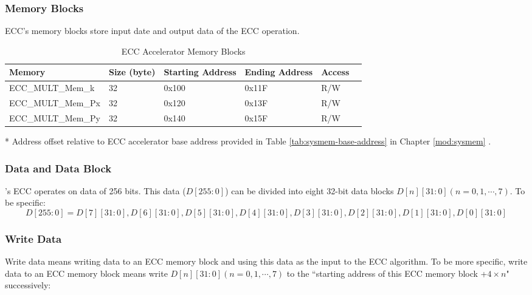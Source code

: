 \documentclass[main\_\_EN.tex]{subfiles}
\begin{document}
\subsubsection{Memory Blocks}

ECC's memory blocks store input date and output data of the ECC operation.

\begin{table}[H]
    \centering
    \caption{ECC Accelerator Memory Blocks} \label{tab:ecc-memory}
    \begin{threeparttable}
    \begin{tabular}{ | l | l | l | l | l | l | }
    \hline
        \rowcolor{lightgray}
        \textbf{Memory} & \textbf{Size (byte)}  &  \textbf{Starting Address}\tnote{*} &  \textbf{Ending Address} \tnote{*} & \textbf{Access}   \\ \hline
        ECC\_MULT\_Mem\_k    & 32  & 0x100 & 0x11F & R/W \\ \hline
        ECC\_MULT\_Mem\_Px   & 32  & 0x120 & 0x13F & R/W \\ \hline
        ECC\_MULT\_Mem\_Py   & 32  & 0x140 & 0x15F & R/W \\ \hline
    \end{tabular}
    \begin{tablenotes}
        \item[*] Address offset relative to ECC accelerator base address provided in Table \ref{tab:sysmem-base-address} in Chapter \ref{mod:sysmem} \textit{}.
    \end{tablenotes}
    \end{threeparttable}
\end{table}

\subsubsection{Data and Data Block}

\chipname{}'s ECC operates on data of 256 bits. This data ($D[255:0]$) can be divided into eight 32-bit data blocks $D[n][31:0] (n=0, 1, \cdots, 7)$. To be specific:
\[
D[255:0] = {D[7][31:0],D[6][31:0],D[5][31:0],
D[4][31:0],D[3][31:0],D[2][31:0],D[1][31:0],D[0][31:0]}
\]

\subsubsection{Write Data}

Write data means writing data to an ECC memory block and using this data as the input to the ECC algorithm. To be more specific, write data to an ECC memory block means write $D[n][31:0] (n=0, 1, \cdots, 7)$ to the ``starting address of this ECC memory block +$
4 \times n$" successively:
\end{document}
